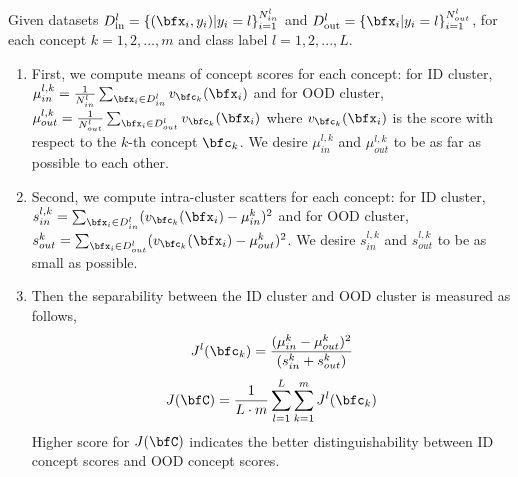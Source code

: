 Given datasets $D_{\text{in}}^{l} = \{(\bfx_i, y_i) | y_i = l\}_{i=1}^{N_{in}^{l}}$ and $D_{\text{out}}^{l} = \{\bfx_i | y_i = l\}_{i=1}^{N_{out}^{l}}$, for each concept $k = 1, 2, ..., m$ and class label $l = 1, 2, ..., L$.
\begin{enumerate}
\item First, we compute means of concept scores for each concept: for ID cluster, $\mu_{in}^{l, k} = \frac{1}{N_{in}^l}\sum_{\bfx_i \in D^{l}_{in}} v_{\bfc_k}(\bfx_i)$ and for OOD cluster, $\mu_{out}^{l, k} = \frac{1}{N_{out}^l}\sum_{\bfx_i \in D^{l}_{out}} v_{\bfc_k}(\bfx_i)$ where $v_{\bfc_k}(\bfx_i)$ is the score with respect to the $k$-th concept $\bfc_k$.
We desire $\mu_{in}^{l, k}$ and $\mu_{out}^{l, k}$ to be as far as possible to each other.
\item Second, we compute intra-cluster scatters for each concept: for ID cluster, $s_{in}^{l, k} = \sum_{\bfx_i \in D^{l}_{in}} (v_{\bfc_k}(\bfx_i) - \mu_{in}^k)^2$ and for OOD cluster, $s_{out}^k = \sum_{\bfx_i \in D^{l}_{out}} (v_{\bfc_k}(\bfx_i) - \mu_{out}^k)^2$.
We desire $s_{in}^{l,k}$ and $s_{out}^{l,k}$ to be as small as possible.
\item Then the separability between the ID cluster and OOD cluster is measured as follows,
\begin{equation*}
    J^l(\bfc_k) = \frac{(\mu_{in}^k - \mu_{out}^k)^2}{(s_{in}^k + s_{out}^k)}
\end{equation*}
\begin{equation}
\label{equ: separability}
    J(\bfC) = \frac{1}{L \cdot m}\sum_{l=1}^L\sum_{k=1}^m J^l(\bfc_k)
\end{equation}
Higher score for $J(\bfC)$ indicates the better distinguishability between ID concept scores and OOD concept scores.
\end{enumerate}

